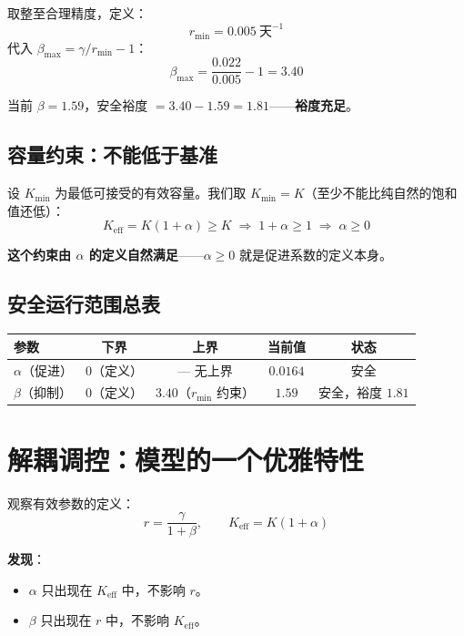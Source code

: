 \documentclass[12pt,a4paper]{article}
\begin{document}
取整至合理精度，定义：
\[
\boxed{r_{\min} = 0.005\ \text{天}^{-1}}
\]
代入 $\beta_{\max} = \gamma/r_{\min} - 1$：
\[
\boxed{\beta_{\max} = \frac{0.022}{0.005} - 1 = 3.40}
\]

当前 $\beta = 1.59$，安全裕度 $= 3.40 - 1.59 = 1.81$——\textbf{裕度充足}。

\subsection{容量约束：不能低于基准}

设 $K_{\min}$ 为最低可接受的有效容量。我们取 $K_{\min} = K$（至少不能比纯自然的饱和值还低）：
\[
K_{\text{eff}} = K(1+\alpha) \geq K \;\Rightarrow\; 1+\alpha \geq 1 \;\Rightarrow\; \alpha \geq 0
\]

\textbf{这个约束由 $\alpha$ 的定义自然满足}——$\alpha \geq 0$ 就是促进系数的定义本身。

\subsection{安全运行范围总表}

\begin{center}
\begin{tabular}{lcccc}
\toprule
参数 & 下界 & 上界 & 当前值 & 状态 \\
\midrule
$\alpha$（促进） & $0$（定义） & — 无上界 & $0.0164$ & 安全 \\
$\beta$（抑制） & $0$（定义） & $3.40$（$r_{\min}$ 约束） & $1.59$ & 安全，裕度 $1.81$ \\
\bottomrule
\end{tabular}
\end{center}

\section{解耦调控：模型的一个优雅特性}

观察有效参数的定义：
\[
r = \frac{\gamma}{1+\beta}, \qquad K_{\text{eff}} = K(1+\alpha)
\]

\textbf{发现}：
\begin{itemize}
  \item $\alpha$ 只出现在 $K_{\text{eff}}$ 中，不影响 $r$。
  \item $\beta$ 只出现在 $r$ 中，不影响 $K_{\text{eff}}$。
\end{itemize}
\end{document}

